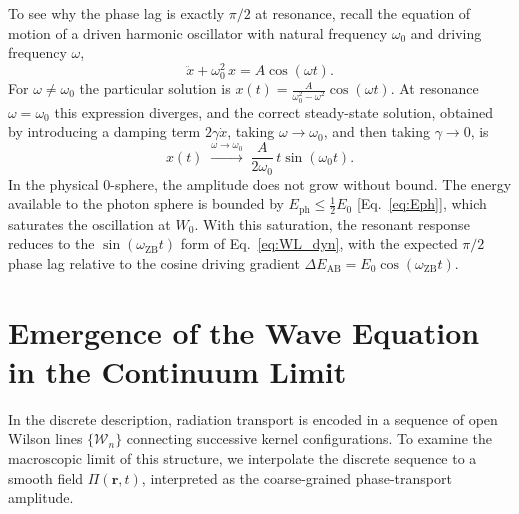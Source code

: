 \documentclass[%
 reprint, amsmath,amssymb, aps, prb, ]{revtex4-2}
\numberwithin{equation}{section}
\newcommand{\omZB}{\omega_{\text{ZB}}}
\newcommand{\EphS}{E_{\text{ph}}}
\newcommand{\Egrad}{\Delta E_{\text{AB}}}
\newcommand{\WL}{\mathcal{W}}
\begin{document}
To see why the phase lag is exactly $\pi/2$ at resonance, recall the equation of motion of a driven harmonic oscillator with natural frequency $\omega_0$ and driving frequency $\omega$,
\begin{equation}
\ddot{x} + \omega_0^2\,x = A\cos(\omega t).
\label{eq:driven}
\end{equation}
For $\omega\neq\omega_0$ the particular solution is $x(t) = \tfrac{A}{\omega_0^2 - \omega^2}\cos(\omega t)$. At resonance $\omega=\omega_0$ this expression diverges, and the correct steady-state solution, obtained by introducing a damping term $2\gamma\dot{x}$, taking $\omega\to\omega_0$, and then taking $\gamma\to 0$, is
\begin{equation}
x(t) \;\xrightarrow{\omega\to\omega_0}\; \frac{A}{2\omega_0}\,t\sin(\omega_0 t).
\label{eq:resonance_grow}
\end{equation}
In the physical 0-sphere, the amplitude does not grow without bound. The energy available to the photon sphere is bounded by $\EphS \leq \tfrac{1}{2}E_0$ [Eq.~\eqref{eq:Eph}], which saturates the oscillation at $W_0$. With this saturation, the resonant response reduces to the $\sin(\omZB t)$ form of Eq.~\eqref{eq:WL_dyn}, with the expected $\pi/2$ phase lag relative to the cosine driving gradient $\Egrad = E_0\cos(\omZB t)$.

\section{Emergence of the Wave Equation in the Continuum Limit}
\label{app:wave}

In the discrete description, radiation transport is encoded in a sequence of open Wilson lines $\{\WL_n\}$ connecting successive kernel configurations. To examine the macroscopic limit of this structure, we interpolate the discrete sequence to a smooth field $\Pi(\mathbf{r},t)$, interpreted as the coarse-grained phase-transport amplitude.
\end{document}
